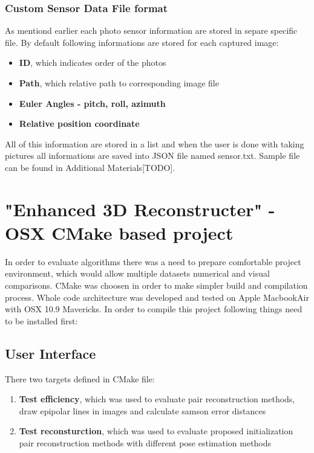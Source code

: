 \subsubsection{Custom Sensor Data File format}
As mentiond earlier each photo sensor information are stored in separe specific file. By default following informations are stored for each captured image:
\begin{itemize}
\item \textbf{ID}, which indicates order of the photos
\item \textbf{Path}, which relative path to corresponding image file
\item \textbf{Euler Angles - pitch, roll, azimuth}
\item \textbf{Relative position coordinate}
\end{itemize} 
All of this information are stored in a list and when the user is done with taking pictures all informations are saved into JSON file named sensor.txt. Sample file can be found in Additional Materials[TODO].\pagebreak

\section{"Enhanced 3D Reconstructer" - OSX CMake based project}
In order to evaluate algorithms there was a need to prepare comfortable project environment, which would allow multiple datasets numerical and visual comparisons. CMake was choosen in order to make simpler build and compilation process. Whole code architecture was developed and tested on Apple MacbookAir with OSX 10.9 Mavericks. In order to compile this project following things need to be installed first:
\subsection{User Interface}
There two targets defined in CMake file:
\begin{enumerate}
\item \textbf{Test efficiency}, which was used to evaluate pair reconstruction methods, draw epipolar lines in images and calculate samson error distances
\item \textbf{Test reconsturction}, which was used to evaluate proposed initialization pair reconstruction methods with different pose estimation methods
\end{enumerate}
